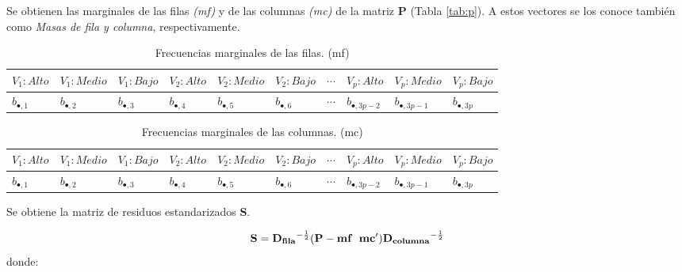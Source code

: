 \documentclass[water,article,submit,moreauthors,pdftex]{mdpi}
\begin{document}
Se obtienen las marginales de las filas \emph{(mf)} y de las columnas
\emph{(mc)} de la matriz \textbf{P} (Tabla \ref{tab:p}). A estos
vectores se los conoce también como \emph{Masas de fila y columna},
respectivamente.

\begin{table}[!ht]
\begin{center}
 \begin{tabular}{||p{1cm}p{1cm}p{1cm}||p{1cm}p{1cm} p{1cm} ||p{1cm} ||p{1cm} p{1cm} p{1cm} ||} 
 \hline
 $V_{1}:Alto$ &$V_{1}:Medio$ &$V_{1}:Bajo$ & $V_{2}:Alto$ & $V_{2}:Medio$ & $V_{2}:Bajo$ & $\cdots$ & $V_{p}:Alto$ & $V_{p}:Medio$ & $V_{p}:Bajo$ \\ [0.5ex] 
 \hline
    $b_{\bullet,1}$ & $b_{\bullet,2}$ & $b_{\bullet,3}$ & $b_{\bullet,4}$ & $b_{\bullet,5}$ & $b_{\bullet,6}$ & $\cdots$ & $b_{\bullet,3p-2}$ & $b_{\bullet,3p-1}$ & $b_{\bullet,3p}$ \\ [0.5ex] 
 \hline
\end{tabular}
\caption{Frecuencias marginales de las filas. (mf)}
\label{tab:margfilas}
\end{center}
\end{table}

\begin{table}[h!]
\begin{center}
 \begin{tabular}{||p{1cm}p{1cm}p{1cm}||p{1cm}p{1cm} p{1cm} ||p{1cm} ||p{1cm} p{1cm} p{1cm} ||} 
 \hline
 $V_{1}:Alto$ &$V_{1}:Medio$ &$V_{1}:Bajo$ & $V_{2}:Alto$ & $V_{2}:Medio$ & $V_{2}:Bajo$ & $\cdots$ & $V_{p}:Alto$ & $V_{p}:Medio$ & $V_{p}:Bajo$ \\ [0.5ex] 
 \hline
    $b_{\bullet,1}$ & $b_{\bullet,2}$ & $b_{\bullet,3}$ & $b_{\bullet,4}$ & $b_{\bullet,5}$ & $b_{\bullet,6}$ & $\cdots$ & $b_{\bullet,3p-2}$ & $b_{\bullet,3p-1}$ & $b_{\bullet,3p}$ \\ [0.5ex] 
 \hline
\end{tabular}
\caption{Frecuencias marginales de las columnas. (mc)}
\label{tab:margcolumnas}
\end{center}
\end{table}

Se obtiene la matriz de residuos estandarizados \textbf{S}.

\begin{equation}
\mathbf{S}=\mathbf{D_{fila}}^{-\frac{1}{2}}(\mathbf{P}-\mathbf{mf} \hspace{0.2cm} \mathbf{mc'})\mathbf{D_{columna}}^{-\frac{1}{2}}
\label{eq:s}
\end{equation} donde:
\end{document}
